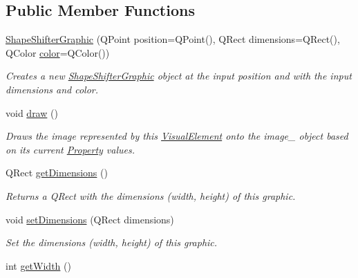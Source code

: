 \subsection*{Public Member Functions}
\begin{DoxyCompactItemize}
\item 
\hyperlink{class_picto_1_1_shape_shifter_graphic_a0039721ac2f95380eaaa98032d35ed5d}{Shape\-Shifter\-Graphic} (Q\-Point position=Q\-Point(), Q\-Rect dimensions=Q\-Rect(), Q\-Color \hyperlink{struct_picto_1_1_visual_element_a45c3042c969717eb2ab60373369c7de7}{color}=Q\-Color())
\begin{DoxyCompactList}\small\item\em Creates a new \hyperlink{class_picto_1_1_shape_shifter_graphic}{Shape\-Shifter\-Graphic} object at the input position and with the input dimensions and color. \end{DoxyCompactList}\item 
\hypertarget{class_picto_1_1_shape_shifter_graphic_a9ed1325d26324c24dc7dccb4622ce3d7}{void \hyperlink{class_picto_1_1_shape_shifter_graphic_a9ed1325d26324c24dc7dccb4622ce3d7}{draw} ()}\label{class_picto_1_1_shape_shifter_graphic_a9ed1325d26324c24dc7dccb4622ce3d7}

\begin{DoxyCompactList}\small\item\em Draws the image represented by this \hyperlink{struct_picto_1_1_visual_element}{Visual\-Element} onto the image\-\_\- object based on its current \hyperlink{class_picto_1_1_property}{Property} values. \end{DoxyCompactList}\item 
Q\-Rect \hyperlink{class_picto_1_1_shape_shifter_graphic_a563be0d126e77169f77e4810f8c42212}{get\-Dimensions} ()
\begin{DoxyCompactList}\small\item\em Returns a Q\-Rect with the dimensions (width, height) of this graphic. \end{DoxyCompactList}\item 
void \hyperlink{class_picto_1_1_shape_shifter_graphic_a87eb1da9657f1d0b1aa1d8b3e4c4abad}{set\-Dimensions} (Q\-Rect dimensions)
\begin{DoxyCompactList}\small\item\em Set the dimensions (width, height) of this graphic. \end{DoxyCompactList}\item 
\hypertarget{class_picto_1_1_shape_shifter_graphic_a3192adefe5cb68657dff90fb2091da79}{int \hyperlink{class_picto_1_1_shape_shifter_graphic_a3192adefe5cb68657dff90fb2091da79}{get\-Width} ()}\label{class_picto_1_1_shape_shifter_graphic_a3192adefe5cb68657dff90fb2091da79}


\end{DoxyCompactItemize}

